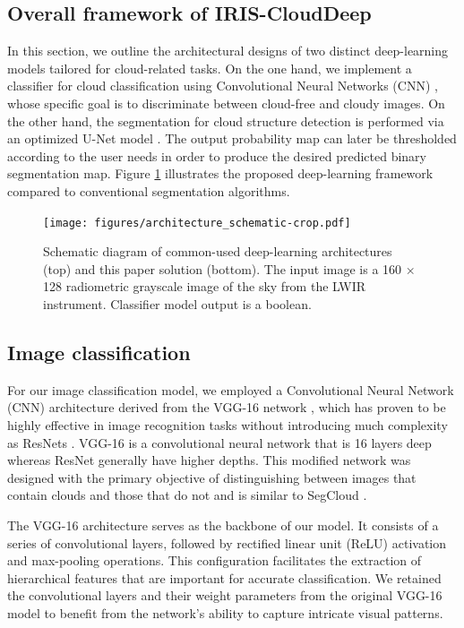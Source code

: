 \documentclass[amt, article]{copernicus}
\begin{document}
\subsection{Overall framework of IRIS-CloudDeep}

In this section, we outline the architectural designs of two distinct deep-learning models tailored for cloud-related tasks. On the one hand, we implement a classifier for cloud classification using Convolutional Neural Networks (CNN) \citep{lecun1995convolutional, Krizhevsky2012}, whose specific goal is to discriminate between cloud-free and cloudy images. On the other hand, the segmentation for cloud structure detection is performed via an optimized U-Net model \citep{UNET}. The output probability map can later be thresholded according to the user needs in order to produce the desired predicted binary segmentation map. Figure \ref{fig:architecture_schematic} illustrates the proposed deep-learning framework compared to conventional segmentation algorithms.

\begin{figure}[t]
	\texttt{[image: figures/architecture\_schematic-crop.pdf]}
	\caption{Schematic diagram of common-used deep-learning architectures (top) and this paper solution (bottom). The input image is a 160 × 128 radiometric grayscale image of the sky from the LWIR instrument. Classifier model output is a boolean.}
    \label{fig:architecture_schematic}
\end{figure}


\subsection{Image classification}

For our image classification model, we employed a Convolutional Neural Network (CNN) architecture \citep{SHARMA2018377} derived from the VGG-16 network \citep{simonyan2015deep}, which has proven to be highly effective in image recognition tasks \citep{canziani2016analysis} without introducing much complexity as ResNets \citep{ResNet}. VGG-16 is a convolutional neural network that is 16 layers deep whereas ResNet generally have higher depths. This modified network was designed with the primary objective of distinguishing between images that contain clouds and those that do not and is similar to SegCloud \citep{SegCloud}.

The VGG-16 architecture serves as the backbone of our model. It consists of a series of convolutional layers, followed by rectified linear unit (ReLU) activation \citep{agarap2018deep} and max-pooling operations. This configuration facilitates the extraction of hierarchical features that are important for accurate classification. We retained the convolutional layers and their weight parameters from the original VGG-16 model to benefit from the network's ability to capture intricate visual patterns.
\end{document}
